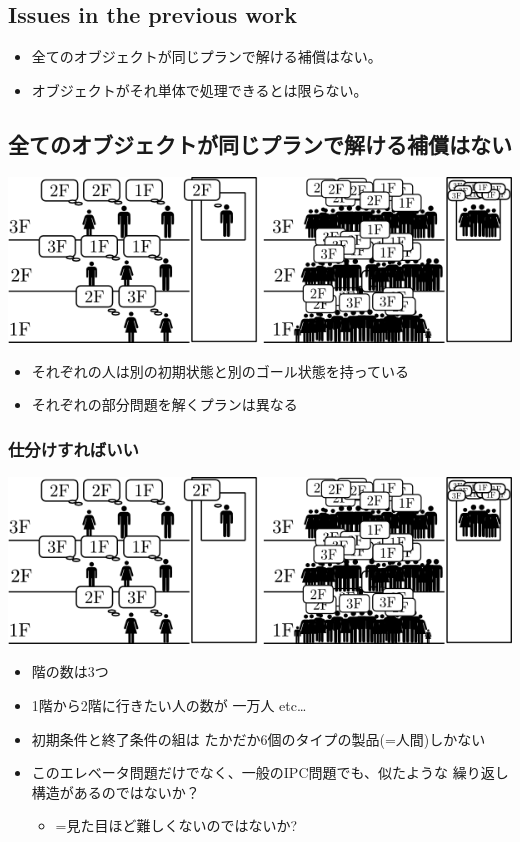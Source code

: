 \subsection{Issues in the previous work}
\label{sec-1-4}

\begin{itemize}
\item 全てのオブジェクトが同じプランで解ける補償はない。
\item オブジェクトがそれ単体で処理できるとは限らない。
\end{itemize}

\subsection{全てのオブジェクトが同じプランで解ける補償はない}
\label{sec-1-5}

\includegraphics[width=.9\linewidth]{img/elevator.png}

\begin{itemize}
\item それぞれの人は別の初期状態と別のゴール状態を持っている
\item それぞれの部分問題を解くプランは異なる
\end{itemize}


\subsubsection{仕分けすればいい}
\label{sec-1-5-1}

\includegraphics[width=.9\linewidth]{img/elevator.png}

\begin{itemize}
\item 階の数は3つ
\item 1階から2階に行きたい人の数が 一万人 etc\ldots{}
\item 初期条件と終了条件の組は たかだか6個のタイプの製品(=人間)しかない
\item このエレベータ問題だけでなく、一般のIPC問題でも、似たような
繰り返し構造があるのではないか？
\begin{itemize}
\item =見た目ほど難しくないのではないか?
\end{itemize}
\end{itemize}

